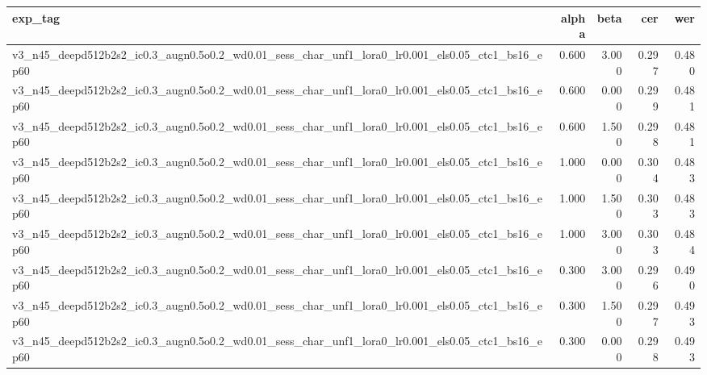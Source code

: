 \begin{tabular}{lrrrr}
\toprule
exp_tag & alpha & beta & cer & wer \\
\midrule
v3_n45_deepd512b2s2_ic0.3_augn0.5o0.2_wd0.01_sess_char_unf1_lora0_lr0.001_els0.05_ctc1_bs16_ep60 & 0.600 & 3.000 & 0.297 & 0.480 \\
v3_n45_deepd512b2s2_ic0.3_augn0.5o0.2_wd0.01_sess_char_unf1_lora0_lr0.001_els0.05_ctc1_bs16_ep60 & 0.600 & 0.000 & 0.299 & 0.481 \\
v3_n45_deepd512b2s2_ic0.3_augn0.5o0.2_wd0.01_sess_char_unf1_lora0_lr0.001_els0.05_ctc1_bs16_ep60 & 0.600 & 1.500 & 0.298 & 0.481 \\
v3_n45_deepd512b2s2_ic0.3_augn0.5o0.2_wd0.01_sess_char_unf1_lora0_lr0.001_els0.05_ctc1_bs16_ep60 & 1.000 & 0.000 & 0.304 & 0.483 \\
v3_n45_deepd512b2s2_ic0.3_augn0.5o0.2_wd0.01_sess_char_unf1_lora0_lr0.001_els0.05_ctc1_bs16_ep60 & 1.000 & 1.500 & 0.303 & 0.483 \\
v3_n45_deepd512b2s2_ic0.3_augn0.5o0.2_wd0.01_sess_char_unf1_lora0_lr0.001_els0.05_ctc1_bs16_ep60 & 1.000 & 3.000 & 0.303 & 0.484 \\
v3_n45_deepd512b2s2_ic0.3_augn0.5o0.2_wd0.01_sess_char_unf1_lora0_lr0.001_els0.05_ctc1_bs16_ep60 & 0.300 & 3.000 & 0.296 & 0.490 \\
v3_n45_deepd512b2s2_ic0.3_augn0.5o0.2_wd0.01_sess_char_unf1_lora0_lr0.001_els0.05_ctc1_bs16_ep60 & 0.300 & 1.500 & 0.297 & 0.493 \\
v3_n45_deepd512b2s2_ic0.3_augn0.5o0.2_wd0.01_sess_char_unf1_lora0_lr0.001_els0.05_ctc1_bs16_ep60 & 0.300 & 0.000 & 0.298 & 0.493 \\
\bottomrule
\end{tabular}
